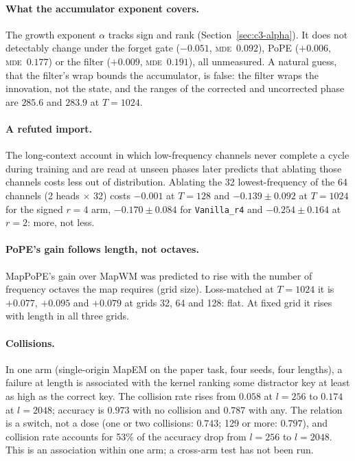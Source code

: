 \documentclass[10pt]{article}
\newcommand{\mde}{\textsc{mde}}
\newcommand{\arm}[1]{\texttt{#1}}
\begin{document}
\paragraph{What the accumulator exponent covers.} The growth exponent $\alpha$ tracks sign and rank
(Section~\ref{sec:c3-alpha}). It does not detectably change under the forget gate ($-0.051$, \mde\ $0.092$),
PoPE ($+0.006$, \mde\ $0.177$) or the filter ($+0.009$, \mde\ $0.191$), all unmeasured. A natural guess, that
the filter's wrap bounds the accumulator, is false: the filter wraps the innovation, not the state, and the
ranges of the corrected and uncorrected phase are $285.6$ and $283.9$ at $T=1024$. %

\paragraph{A refuted import.} The long-context account in which low-frequency channels never complete a cycle
during training and are read at unseen phases later predicts that ablating those channels costs less out of
distribution. Ablating the 32 lowest-frequency of the 64 channels (2 heads $\times$ 32) costs $-0.001$ at $T=128$ and $-0.139\pm0.092$ at
$T=1024$ for the signed $r=4$ arm, $-0.170\pm0.084$ for \arm{Vanilla\_r4} and $-0.254\pm0.164$ at $r=2$: more,
not less. %

\paragraph{PoPE's gain follows length, not octaves.} MapPoPE's gain over MapWM was predicted to rise with
the number of frequency octaves the map requires (grid size). Loss-matched at $T=1024$ it is $+0.077$,
$+0.095$ and $+0.079$ at grids 32, 64 and 128: flat. At fixed grid it rises with length in all three grids.

\paragraph{Collisions.} In one arm (single-origin MapEM on the paper task, four seeds, four lengths), a
failure at length is associated with the kernel ranking some distractor key at least as high as the correct
key. The collision rate rises from $0.058$ at $l=256$ to $0.174$ at $l=2048$; accuracy is $0.973$ with no
collision and $0.787$ with any. The relation is a switch, not a dose (one or two collisions: $0.743$; 129 or
more: $0.797$), and collision rate accounts for 53\% of the accuracy drop from $l=256$ to $l=2048$. This is an
association within one arm; a cross-arm test has not been run. %
\end{document}
